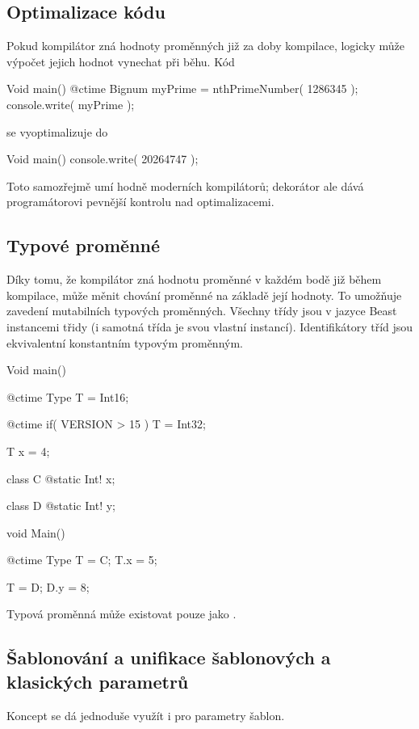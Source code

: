 \subsection{Optimalizace kódu}
Pokud kompilátor zná hodnoty \ctime proměnných již za doby kompilace, logicky může výpočet jejich hodnot vynechat při běhu. Kód

\begin{code}
Void main() {
	@ctime Bignum myPrime = nthPrimeNumber( 1286345 );
	console.write( myPrime );
}
\end{code}

se vyoptimalizuje do

\begin{code}
Void main() {
	console.write( 20264747 );
}
\end{code}

Toto samozřejmě umí hodně moderních kompilátorů; dekorátor  ale dává programátorovi pevnější kontrolu nad optimalizacemi.

\subsection{Typové proměnné} \label{ctime:typeVars}
Díky tomu, že kompilátor zná hodnotu \ctime proměnné v každém bodě již během kompilace, může měnit chování \ctime proměnné na základě její hodnoty. To umožňuje zavedení mutabilních typových proměnných. Všechny třídy jsou v jazyce Beast instancemi třidy  (i samotná třída  je svou vlastní instancí). Identifikátory tříd jsou ekvivalentní konstantním typovým proměnným.

\begin{code}
Void main() {
	@ctime Type T = Int16;
	
	@ctime if( VERSION > 15 )
		T = Int32;
		
	T x = 4;
}
\end{code}

\begin{code}
class C {
	@static Int! x;
}

class D {
	@static Int! y;
}

void Main() {
	@ctime Type T = C;
	T.x = 5;
	
	T = D;
	D.y = 8;
}
\end{code}

Typová proměnná může existovat pouze jako \ctime.

\subsection{Šablonování a unifikace šablonových a klasických parametrů}
Koncept \ctime se dá jednoduše využít i pro parametry šablon.

